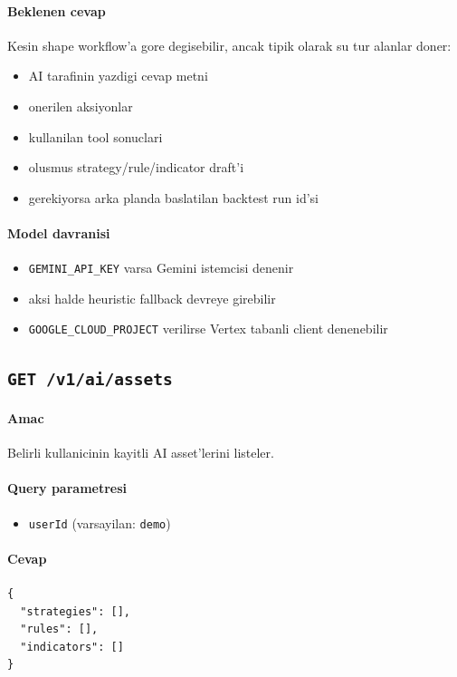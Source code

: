 \documentclass[11pt,a4paper]{article}
\begin{document}
\paragraph{Beklenen cevap}
Kesin shape workflow'a gore degisebilir, ancak tipik olarak su tur alanlar doner:

\begin{itemize}[leftmargin=1.5em]
    \item AI tarafinin yazdigi cevap metni
    \item onerilen aksiyonlar
    \item kullanilan tool sonuclari
    \item olusmus strategy/rule/indicator draft'i
    \item gerekiyorsa arka planda baslatilan backtest run id'si
\end{itemize}

\paragraph{Model davranisi}
\begin{itemize}[leftmargin=1.5em]
    \item \texttt{GEMINI\_API\_KEY} varsa Gemini istemcisi denenir
    \item aksi halde heuristic fallback devreye girebilir
    \item \texttt{GOOGLE\_CLOUD\_PROJECT} verilirse Vertex tabanli client denenebilir
\end{itemize}

\subsection{\texttt{GET /v1/ai/assets}}

\paragraph{Amac}
Belirli kullanicinin kayitli AI asset'lerini listeler.

\paragraph{Query parametresi}
\begin{itemize}[leftmargin=1.5em]
    \item \texttt{userId} (varsayilan: \texttt{demo})
\end{itemize}

\paragraph{Cevap}
\begin{lstlisting}
{
  "strategies": [],
  "rules": [],
  "indicators": []
}
\end{lstlisting}
\end{document}
